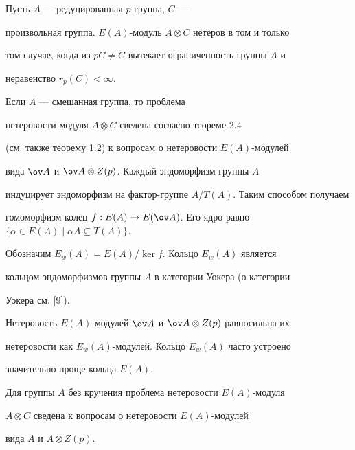  


\begin{cors} 


Пусть $A$ --- редуцированная $p$-группа, $C$ --- 


произвольная группа.\; $E(A)$-модуль $A\otimes C$ нетеров в том и только 


том случае, когда из $p C\ne C$ вытекает ограниченность группы $A$ и 


неравенство $r_p(C)<\infty$. 


\end{cors} 


 


\begin{notes} 


Если $A$ --- смешанная группа, то проблема 


нетеровости модуля $A\otimes C$ сведена согласно теореме 2.4 


(см. также теорему 1.2) к вопросам о нетеровости $E(A)$-модулей 


вида $\ov A$ и $\ov A\otimes Z(p)$. Каждый эндоморфизм группы $A$ 


индуцирует эндоморфизм на фактор-группе $A/T(A)$. Таким способом получаем 


гомоморфизм колец $f:E(A)\to E(\ov A)$. Его ядро равно $\{\alpha\in 


E(A)\mid \alpha A\subseteq T(A)\}$. 


Обозначим $E_w(A)=E(A)/\ker f$. Кольцо $E_w(A)$ является 


кольцом эндоморфизмов группы $A$ в категории Уокера (о категории 


Уокера см. [9]). 


 


Нетеровость $E(A)$-модулей $\ov A$ и $\ov A\otimes Z(p)$ равносильна их 


нетеровости как $E_w(A)$-модулей. Кольцо $E_w(A)$ часто устроено 


значительно проще кольца $E(A)$. 


\end{notes} 


 


\begin{notes} 


Для группы $A$ без кручения проблема нетеровости $E(A)$-модуля 


$A\otimes C$ сведена к вопросам о нетеровости $E(A)$-модулей 


вида $A$ и $A\otimes Z(p)$. 


\end{notes} 


